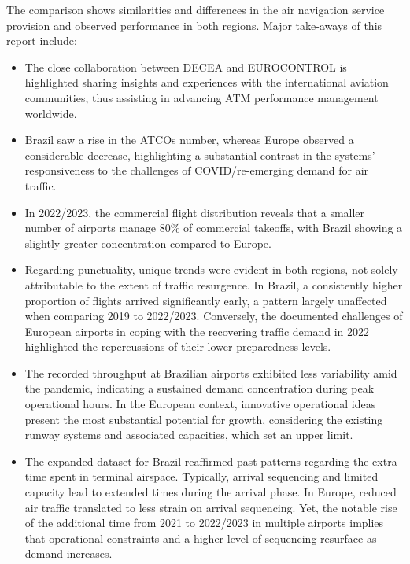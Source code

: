 \documentclass[
  a4paper,
  DIV=11,
  numbers=noendperiod]{scrreport}
\providecommand{\tightlist}{%
  \setlength{\itemsep}{0pt}\setlength{\parskip}{0pt}}\usepackage{longtable,booktabs,array}
\begin{document}
The comparison shows similarities and differences in the air navigation
service provision and observed performance in both regions. Major
take-aways of this report include:

\begin{itemize}
\tightlist
\item
  The close collaboration between DECEA and EUROCONTROL is highlighted
  sharing insights and experiences with the international aviation
  communities, thus assisting in advancing ATM performance management
  worldwide.
\item
  Brazil saw a rise in the ATCOs number, whereas Europe observed a
  considerable decrease, highlighting a substantial contrast in the
  systems' responsiveness to the challenges of COVID/re-emerging demand
  for air traffic.
\item
  In 2022/2023, the commercial flight distribution reveals that a
  smaller number of airports manage 80\% of commercial takeoffs, with
  Brazil showing a slightly greater concentration compared to Europe.
\item
  Regarding punctuality, unique trends were evident in both regions, not
  solely attributable to the extent of traffic resurgence. In Brazil, a
  consistently higher proportion of flights arrived significantly early,
  a pattern largely unaffected when comparing 2019 to 2022/2023.
  Conversely, the documented challenges of European airports in coping
  with the recovering traffic demand in 2022 highlighted the
  repercussions of their lower preparedness levels.
\item
  The recorded throughput at Brazilian airports exhibited less
  variability amid the pandemic, indicating a sustained demand
  concentration during peak operational hours. In the European context,
  innovative operational ideas present the most substantial potential
  for growth, considering the existing runway systems and associated
  capacities, which set an upper limit.
\item
  The expanded dataset for Brazil reaffirmed past patterns regarding the
  extra time spent in terminal airspace. Typically, arrival sequencing
  and limited capacity lead to extended times during the arrival phase.
  In Europe, reduced air traffic translated to less strain on arrival
  sequencing. Yet, the notable rise of the additional time from 2021 to
  2022/2023 in multiple airports implies that operational constraints
  and a higher level of sequencing resurface as demand increases.
\end{itemize}
\end{document}
